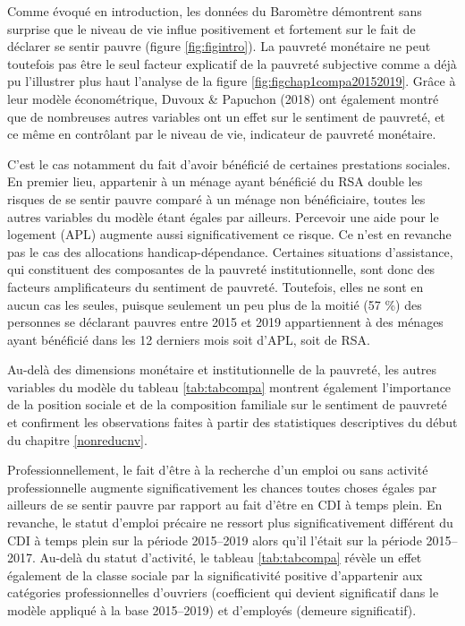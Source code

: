 \documentclass[12pt,a4paper]{reedthesis}
\begin{document}
Comme évoqué en introduction, les données du Baromètre démontrent sans surprise que le niveau de vie influe positivement et fortement sur le fait de déclarer se sentir pauvre (figure \ref{fig:figintro}). La pauvreté monétaire ne peut toutefois pas être le seul facteur explicatif de la pauvreté subjective comme a déjà pu l'illustrer plus haut l'analyse de la figure \ref{fig:figchap1compa20152019}. Grâce à leur modèle économétrique, Duvoux \& Papuchon (2018) ont également montré que de nombreuses autres variables ont un effet sur le sentiment de pauvreté, et ce même en contrôlant par le niveau de vie, indicateur de pauvreté monétaire.

C'est le cas notamment du fait d'avoir bénéficié de certaines prestations sociales. En premier lieu, appartenir à un ménage ayant bénéficié du RSA double les risques de se sentir pauvre comparé à un ménage non bénéficiaire, toutes les autres variables du modèle étant égales par ailleurs. Percevoir une aide pour le logement (APL) augmente aussi significativement ce risque. Ce n'est en revanche pas le cas des allocations handicap-dépendance. Certaines situations d'assistance, qui constituent des composantes de la pauvreté institutionnelle, sont donc des facteurs amplificateurs du sentiment de pauvreté. Toutefois, elles ne sont en aucun cas les seules, puisque seulement un peu plus de la moitié (57 \%) des personnes se déclarant pauvres entre 2015 et 2019 appartiennent à des ménages ayant bénéficié dans les 12 derniers mois soit d'APL, soit de RSA.

Au-delà des dimensions monétaire et institutionnelle de la pauvreté, les autres variables du modèle du tableau \ref{tab:tabcompa} montrent également l'importance de la position sociale et de la composition familiale sur le sentiment de pauvreté et confirment les observations faites à partir des statistiques descriptives du début du chapitre \ref{nonreducnv}.

Professionnellement, le fait d'être à la recherche d'un emploi ou sans activité professionnelle augmente significativement les chances toutes choses égales par ailleurs de se sentir pauvre par rapport au fait d'être en CDI à temps plein. En revanche, le statut d'emploi précaire ne ressort plus significativement différent du CDI à temps plein sur la période 2015--2019 alors qu'il l'était sur la période 2015--2017. Au-delà du statut d'activité, le tableau \ref{tab:tabcompa} révèle un effet également de la classe sociale par la significativité positive d'appartenir aux catégories professionnelles d'ouvriers (coefficient qui devient significatif dans le modèle appliqué à la base 2015--2019) et d'employés (demeure significatif).
\end{document}
